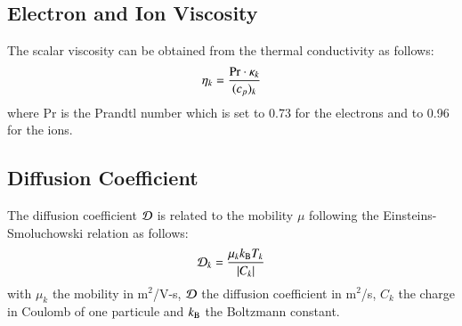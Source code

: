 \documentclass{warpdoc}
\begin{document}
\subsection{Electron and Ion Viscosity}

The scalar viscosity can be obtained from the thermal conductivity as follows:
%
\begin{equation}
\eta_k = \frac{{\rm Pr} \cdot \kappa_k}{(c_p)_k}
\end{equation}
% 
where Pr is the Prandtl number which is set to 0.73 for the electrons and to 0.96 for the ions.

\subsection{Diffusion Coefficient}

The diffusion coefficient ${\cal D}$ is related to the mobility $\mu$ following the Einsteins-Smoluchowski relation as follows:
%
\begin{equation}
    {\cal D}_k= \frac{\mu_k k_{\rm B} T_k}{|C_k|}
\end{equation}
%
with $\mu_k$ the mobility in m$^2$/V-s, $\cal D$ the diffusion coefficient in m$^2$/s, $C_k$ the charge in Coulomb of one particule and $k_{\rm B}$ the Boltzmann constant.
\end{document}
